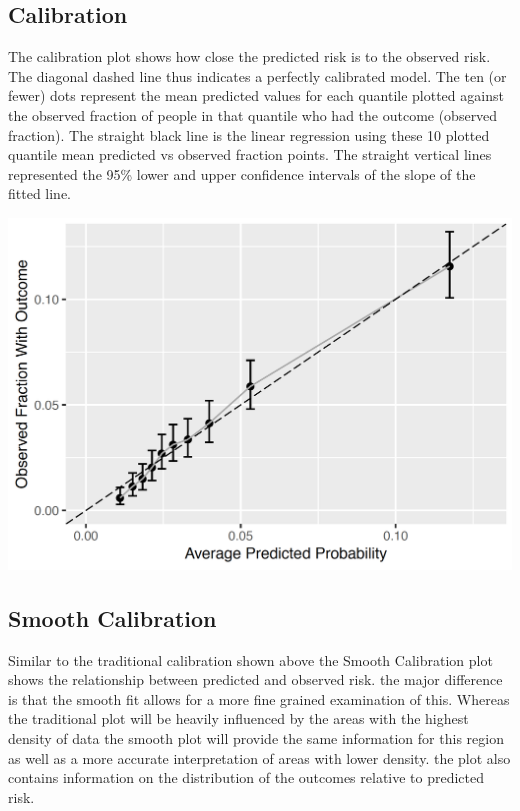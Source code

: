 \documentclass[]{book}
\begin{document}
\newpage

\subsection{Calibration}\label{calibration}

The calibration plot shows how close the predicted risk is to the
observed risk. The diagonal dashed line thus indicates a perfectly
calibrated model. The ten (or fewer) dots represent the mean predicted
values for each quantile plotted against the observed fraction of people
in that quantile who had the outcome (observed fraction). The straight
black line is the linear regression using these 10 plotted quantile mean
predicted vs observed fraction points. The straight vertical lines
represented the 95\% lower and upper confidence intervals of the slope
of the fitted line.

\includegraphics{images/PatientLevelPrediction/sparseCalibration.png}

\newpage

\subsection{Smooth Calibration}\label{smooth-calibration}

Similar to the traditional calibration shown above the Smooth
Calibration plot shows the relationship between predicted and observed
risk. the major difference is that the smooth fit allows for a more fine
grained examination of this. Whereas the traditional plot will be
heavily influenced by the areas with the highest density of data the
smooth plot will provide the same information for this region as well as
a more accurate interpretation of areas with lower density. the plot
also contains information on the distribution of the outcomes relative
to predicted risk.
\end{document}

